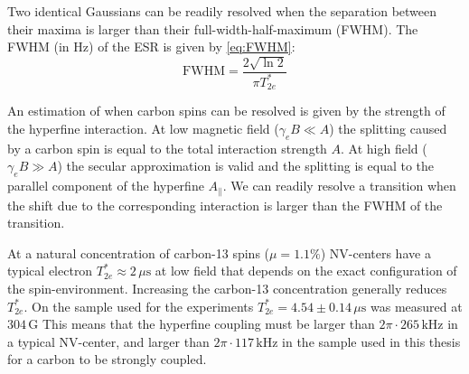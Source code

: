 Two identical Gaussians can be readily resolved when the separation between their maxima is larger than their full-width-half-maximum (FWHM).
The FWHM (in Hz) of the ESR is given by \cref{eq:FWHM}:
\begin{equation}
    \mathrm{FWHM} =  \frac{2\sqrt{\ln{2}}}{\pi T_{2e}^*}
    \label{eq:FWHM}
\end{equation}

An estimation of when carbon spins can be resolved is given by the strength of the hyperfine interaction.
At low magnetic field ($\gamma_e B \ll A$) the splitting caused by a carbon spin is equal to the total interaction strength $A$.
At high field ($\gamma_e B \gg A$) the secular approximation is valid and the splitting is equal to the parallel component of the hyperfine $A_\parallel$.
We can readily resolve a transition when the shift due to the corresponding interaction is larger than the FWHM of the transition.

At a natural concentration of carbon-13 spins ($\mu =1.1\%$) NV-centers have a typical  electron $T_{2e}^* \approx 2\,\mu \mathrm{s}$ at low field that depends on the exact configuration of the spin-environment.
Increasing the carbon-13 concentration generally reduces $T_{2e}^*$.
On the sample used for the experiments $T_{2e}^*=4.54 \pm 0.14\, \mu\mathrm{s}$ was measured at $304\, \mathrm{G}$
This means that the hyperfine coupling must be larger than $2\pi\cdot 265\,\mathrm{kHz}$ in a typical NV-center, and larger than $2\pi\cdot 117\, \mathrm{kHz}$ in the sample used in this thesis for a carbon to be strongly coupled.

